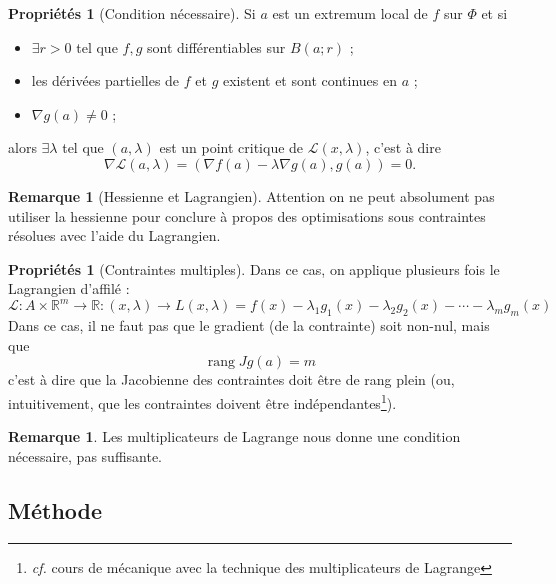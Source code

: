 \documentclass[11pt,a4paper]{article}
\theoremstyle{definition}
\newtheorem{myprop}[mydef]{Propriétés}
\newtheorem{myrem}[mydef]{Remarque}
\DeclareMathOperator{\newrang}{rang}
\newcommand{\R}{\mathbb{R}}
\begin{document}
\begin{myprop}[Condition nécessaire]
	Si $a$ est un extremum local de $f$ sur $\Phi$ et si
	\begin{itemize}
		\item $\exists r >0$ tel que $f, g$ sont différentiables
			sur $B(a;r)$ ;
		\item les dérivées partielles de $f$ et $g$ existent et sont continues en $a$ ;
		\item $\nabla g(a) \neq 0$ ;
	\end{itemize}
	alors $\exists \lambda$ tel que $(a,\lambda)$ est un point critique de $\mathcal{L}(x,\lambda)$, c'est à dire
	\[ \nabla \mathcal{L}(a,\lambda) = (\nabla f(a) - \lambda\nabla g(a), g(a)) = 0 .\]
\end{myprop}

\begin{myrem}[Hessienne et Lagrangien]
	Attention on ne peut absolument pas utiliser la hessienne pour conclure à propos des optimisations sous contraintes résolues avec l'aide du Lagrangien.
\end{myrem}

\begin{myprop}[Contraintes multiples]
	Dans ce cas, on applique plusieurs fois le Lagrangien d'affilé :
	\[ \mathcal{L} : A \times \R^m \to \R : (x, \lambda) \to L(x, \lambda) = f(x) - \lambda_1 g_1(x) - \lambda_2 g_2(x) - \cdots - \lambda_m g_m(x) \]
	Dans ce cas, il ne faut pas que le gradient (de la contrainte) soit non-nul, mais que
	\[ \newrang Jg(a) = m \]
	c'est à dire que la Jacobienne des contraintes doit être de rang plein (ou, intuitivement, que les contraintes doivent être indépendantes\footnote{\emph{cf.} cours de mécanique avec la technique des multiplicateurs de Lagrange}).
\end{myprop}

\begin{myrem}
	Les multiplicateurs de Lagrange nous donne une condition nécessaire, pas suffisante.
\end{myrem}

\subsection{Méthode}
\end{document}
